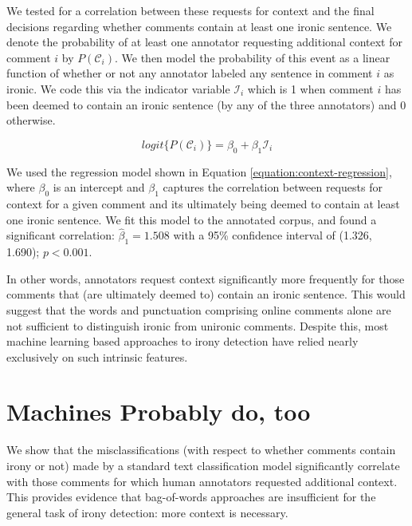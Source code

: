\documentclass[11pt]{article}
\begin{document}
We tested for a correlation between these requests for context and the final decisions regarding whether comments contain at least one ironic sentence. We denote the probability of at least one annotator requesting additional context for comment $i$ by $P(\mathcal{C}_i)$. We then model the probability of this event as a linear function of whether or not any annotator labeled any sentence in comment $i$ as ironic. We code this via the indicator variable $\mathcal{I}_i$ which is 1 when comment $i$ has been deemed to contain an ironic sentence (by any of the three annotators) and 0 otherwise.

\vspace{-1em}
\begin{equation}
	logit\{P(\mathcal{C}_i)\} = \beta_0 + \beta_1 \mathcal{I}_i
	\label{equation:context-regression}
\end{equation}

We used the regression model shown in Equation \ref{equation:context-regression}, where $\beta_0$ is an intercept and $\beta_1$ captures the correlation between requests for context for a given comment and its ultimately being deemed to contain at least one ironic sentence. We fit this model to the annotated corpus, and found a significant correlation: $\hat{\beta}_1 = 1.508$ with a 95\% confidence interval of (1.326, 1.690); $p < 0.001$. 

In other words, annotators request context significantly more frequently for those comments that (are ultimately deemed to) contain an ironic sentence. This would suggest that the words and punctuation comprising online comments alone are not sufficient to distinguish ironic from unironic comments. Despite this, most machine learning based approaches to irony detection have relied nearly exclusively on such intrinsic features. %


\section{Machines Probably do, too}
\label{section:machines}

We show that the misclassifications (with respect to whether comments contain irony or not) made by a standard text classification model significantly correlate with those comments for which human annotators requested additional context. This provides evidence that bag-of-words approaches are insufficient for the general task of irony detection: more context is necessary.
\end{document}
